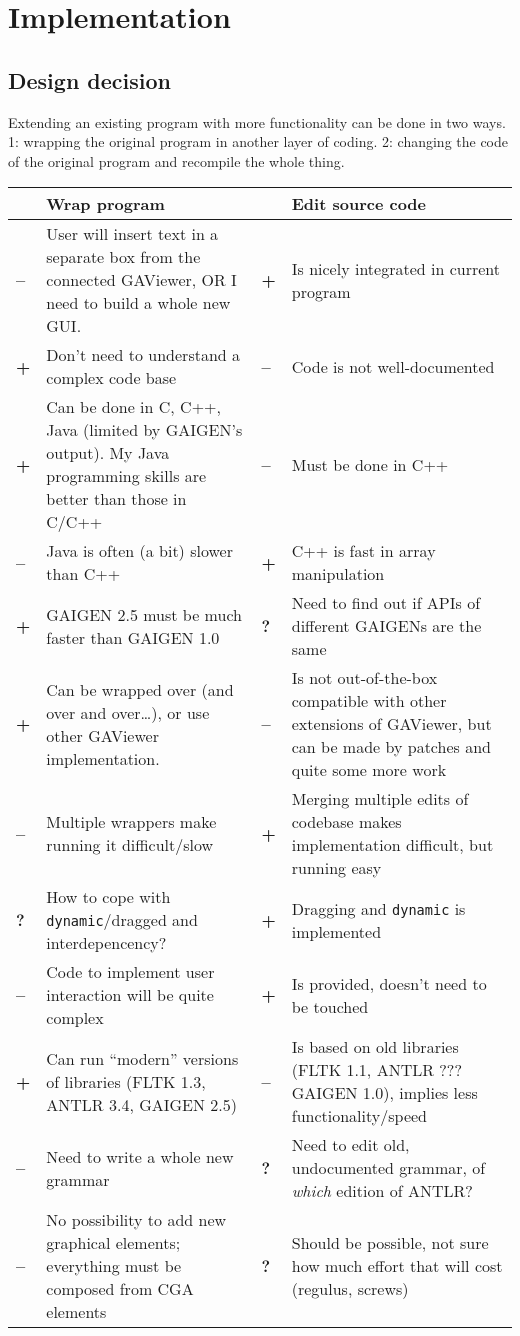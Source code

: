 \section{Implementation}
\label{ch:implementation}


\subsection{Design decision}


Extending an existing program with more functionality can be done in two ways. 1: wrapping the original program in another layer of coding. 2: changing the code of the original program and recompile the whole thing.

\newcommand{\pro}{\textbf{+} &}
\newcommand{\con}{\textbf{--} &}
\newcommand{\que}{\textbf{?} &}
\begin{tabular}{p{0.5cm}p{5.5cm}|p{0.5cm}p{5.5cm}}
  & Wrap program & & Edit source code \\
  \hline
  \con User will insert text in a separate box from the connected GAViewer, OR I need to build a whole new GUI. & \pro Is nicely integrated in current program \\
  \pro Don't need to understand a complex code base & \con Code is not well-documented \\
  \pro Can be done in C, C++, Java (limited by GAIGEN's output). My Java programming skills are better than those in C/C++ & \con Must be done in C++ \\
  \con Java is often (a bit) slower than C++ & \pro C++ is fast in array manipulation \\
  \pro GAIGEN 2.5 must be much faster than GAIGEN 1.0 & \que Need to find out if APIs of different GAIGENs are the same \\
  \pro Can be wrapped over (and over and over\ldots), or use other GAViewer implementation. & \con Is not out-of-the-box compatible with other extensions of GAViewer, but can be made by patches and quite some more work \\
  \con Multiple wrappers make running it difficult/slow & \pro Merging multiple edits of codebase makes implementation difficult, but running easy \\
  \que How to cope with \texttt{dynamic}/dragged and interdepencency? & \pro Dragging and \texttt{dynamic} is implemented \\
  \con Code to implement user interaction will be quite complex & \pro Is provided, doesn't need to be touched \\
  \pro Can run ``modern'' versions of libraries (FLTK 1.3, ANTLR 3.4, GAIGEN 2.5) & \con Is based on old libraries (FLTK 1.1, ANTLR ??? GAIGEN 1.0), implies less functionality/speed \\
  \con Need to write a whole new grammar & \que Need to edit old, undocumented grammar, of \emph{which} edition of ANTLR? \\
  \con No possibility to add new graphical elements; everything must be composed from CGA elements & \que Should be possible, not sure how much effort that will cost (regulus, screws)
\end{tabular}

